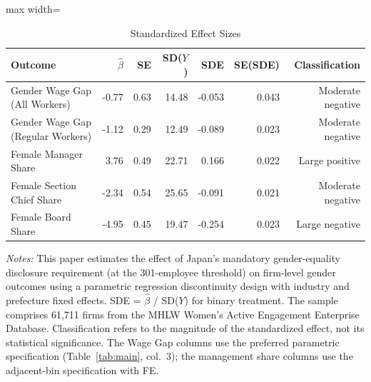 \begin{table}[t]
\centering
\caption{Standardized Effect Sizes}
\label{tab:sde}
\begin{adjustbox}{max width=\textwidth}
\begin{tabular}{lrrrrrr}
\hline\hline
Outcome & $\hat{\beta}$ & SE & SD($Y$) & SDE & SE(SDE) & Classification \\
\hline
Gender Wage Gap (All Workers) & -0.77 & 0.63 & 14.48 & -0.053 & 0.043 & Moderate negative \\
Gender Wage Gap (Regular Workers) & -1.12 & 0.29 & 12.49 & -0.089 & 0.023 & Moderate negative \\
Female Manager Share & 3.76 & 0.49 & 22.71 & 0.166 & 0.022 & Large positive \\
Female Section Chief Share & -2.34 & 0.54 & 25.65 & -0.091 & 0.021 & Moderate negative \\
Female Board Share & -4.95 & 0.45 & 19.47 & -0.254 & 0.023 & Large negative \\
\hline\hline
\end{tabular}
\end{adjustbox}
\begin{tablenotes}\small
\item \textit{Notes:} This paper estimates the effect of Japan's mandatory gender-equality disclosure requirement (at the 301-employee threshold) on firm-level gender outcomes using a parametric regression discontinuity design with industry and prefecture fixed effects. SDE = $\hat{\beta}$ / SD($Y$) for binary treatment. The sample comprises 61,711 firms from the MHLW Women's Active Engagement Enterprise Database. Classification refers to the magnitude of the standardized effect, not its statistical significance. The Wage Gap columns use the preferred parametric specification (Table~\ref{tab:main}, col.~3); the management share columns use the adjacent-bin specification with FE.
\end{tablenotes}
\end{table}

